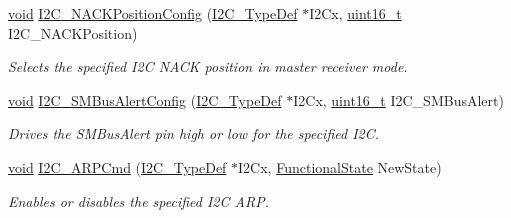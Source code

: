 \begin{DoxyCompactItemize}
\hyperlink{group___n_a_m_e_ga18028b8badbf1ea7e704ccac3c488e82}{void} \hyperlink{group___i2_c___group1_gad08ebffc3a234d84e6405ec115bd74f1}{I2\-C\-\_\-\-N\-A\-C\-K\-Position\-Config} (\hyperlink{struct_i2_c___type_def}{I2\-C\-\_\-\-Type\-Def} $\ast$I2\-Cx, \hyperlink{stdint_8h_a273cf69d639a59973b6019625df33e30}{uint16\-\_\-t} I2\-C\-\_\-\-N\-A\-C\-K\-Position)
\begin{DoxyCompactList}\small\item\em Selects the specified I2\-C N\-A\-C\-K position in master receiver mode. \end{DoxyCompactList}\item 
\hyperlink{group___n_a_m_e_ga18028b8badbf1ea7e704ccac3c488e82}{void} \hyperlink{group___i2_c___group1_ga75a810776d9710d2f6d9c5d9e93241c6}{I2\-C\-\_\-\-S\-M\-Bus\-Alert\-Config} (\hyperlink{struct_i2_c___type_def}{I2\-C\-\_\-\-Type\-Def} $\ast$I2\-Cx, \hyperlink{stdint_8h_a273cf69d639a59973b6019625df33e30}{uint16\-\_\-t} I2\-C\-\_\-\-S\-M\-Bus\-Alert)
\begin{DoxyCompactList}\small\item\em Drives the S\-M\-Bus\-Alert pin high or low for the specified I2\-C. \end{DoxyCompactList}\item 
\hyperlink{group___n_a_m_e_ga18028b8badbf1ea7e704ccac3c488e82}{void} \hyperlink{group___i2_c___group1_ga66d86742bf1be58b17ef8779ffc79d02}{I2\-C\-\_\-\-A\-R\-P\-Cmd} (\hyperlink{struct_i2_c___type_def}{I2\-C\-\_\-\-Type\-Def} $\ast$I2\-Cx, \hyperlink{group___exported__types_gac9a7e9a35d2513ec15c3b537aaa4fba1}{Functional\-State} New\-State)
\begin{DoxyCompactList}\small\item\em Enables or disables the specified I2\-C A\-R\-P. \end{DoxyCompactList}\end{DoxyCompactItemize}


